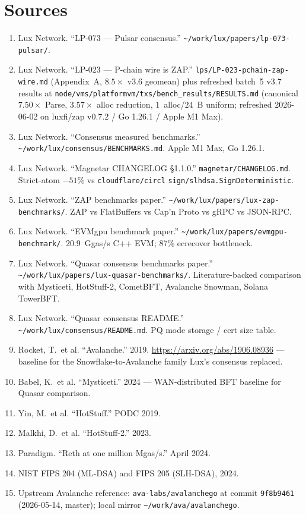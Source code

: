 \documentclass[11pt,a4paper]{article}
\begin{document}
\section*{Sources}

\begin{enumerate}[leftmargin=1.4em,topsep=0.2em,itemsep=0.1em]
  \item Lux Network. ``LP-073 --- Pulsar consensus.''
        \texttt{\textasciitilde/work/lux/papers/lp-073-pulsar/}.
  \item Lux Network. ``LP-023 --- P-chain wire is ZAP.''
        \texttt{lps/LP-023-pchain-zap-wire.md} (Appendix~A,
        $8.5\times$ v3.6 geomean) plus refreshed batch~5 v3.7 results at
        \texttt{node/vms/platformvm/txs/bench\_results/RESULTS.md}
        (canonical $7.50\times$ Parse, $3.57\times$ alloc reduction,
        $1$~alloc/$24$~B uniform; refreshed 2026-06-02 on luxfi/zap
        v0.7.2 / Go 1.26.1 / Apple M1 Max).
  \item Lux Network. ``Consensus measured benchmarks.''
        \texttt{\textasciitilde/work/lux/consensus/BENCHMARKS.md}.
        Apple M1 Max, Go 1.26.1.
  \item Lux Network. ``Magnetar CHANGELOG \S{}1.1.0.''
        \texttt{magnetar/CHANGELOG.md}. Strict-atom $-51\%$ vs
        \texttt{cloudflare/circl} \texttt{sign/slhdsa.SignDeterministic}.
  \item Lux Network. ``ZAP benchmarks paper.''
        \texttt{\textasciitilde/work/lux/papers/lux-zap-benchmarks/}.
        ZAP vs FlatBuffers vs Cap'n Proto vs gRPC vs JSON-RPC.
  \item Lux Network. ``EVMgpu benchmark paper.''
        \texttt{\textasciitilde/work/lux/papers/evmgpu-benchmark/}.
        20.9~Ggas/s C++ EVM; 87\% ecrecover bottleneck.
  \item Lux Network. ``Quasar consensus benchmarks paper.''
        \texttt{\textasciitilde/work/lux/papers/lux-quasar-benchmarks/}.
        Literature-backed comparison with Mysticeti, HotStuff-2,
        CometBFT, Avalanche Snowman, Solana TowerBFT.
  \item Lux Network. ``Quasar consensus README.''
        \texttt{\textasciitilde/work/lux/consensus/README.md}.
        PQ mode storage / cert size table.
  \item Rocket, T.\ et al. ``Avalanche.'' 2019.
        \url{https://arxiv.org/abs/1906.08936} --- baseline for the
        Snowflake-to-Avalanche family Lux's consensus replaced.
  \item Babel, K.\ et al. ``Mysticeti.'' 2024 --- WAN-distributed BFT
        baseline for Quasar comparison.
  \item Yin, M.\ et al. ``HotStuff.'' PODC 2019.
  \item Malkhi, D.\ et al. ``HotStuff-2.'' 2023.
  \item Paradigm. ``Reth at one million Mgas/s.'' April 2024.
  \item NIST FIPS 204 (ML-DSA) and FIPS 205 (SLH-DSA), 2024.
  \item Upstream Avalanche reference:
        \texttt{ava-labs/avalanchego} at commit
        \texttt{9f8b9461} (2026-05-14, master); local mirror
        \texttt{\textasciitilde/work/ava/avalanchego}.
\end{enumerate}
\end{document}
